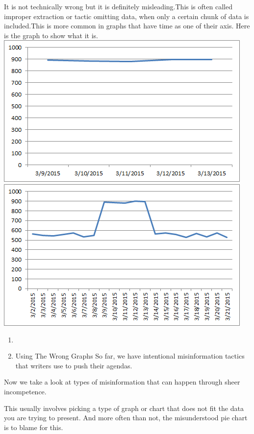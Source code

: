 \documentclass[]{book}
\theoremstyle{definition}
\theoremstyle{definition}
\theoremstyle{definition}
\theoremstyle{remark}
\begin{document}
It is not technically wrong but it is definitely misleading.This is
often called improper extraction or tactic omitting data, when only a
certain chunk of data is included.This is more common in graphs that
have time as one of their axis. Here is the graph to show what it is.
\includegraphics{images/Bad_graph_extraction.png}
\includegraphics{images/Good_graph_extraction.png}

\begin{enumerate}
\def\labelenumi{\arabic{enumi}.}
\setcounter{enumi}{3}
\item
\item
  Using The Wrong Graphs So far, we have intentional misinformation
  tactics that writers use to push their agendas.
\end{enumerate}

Now we take a look at types of misinformation that can happen through
sheer incompetence.

This usually involves picking a type of graph or chart that does not fit
the data you are trying to present. And more often than not, the
misunderstood pie chart is to blame for this.
\end{document}
